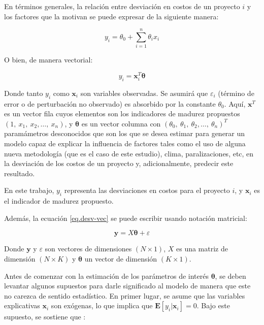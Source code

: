 En términos generales, la relación entre desviación en costos de un proyecto $i$ y los factores que la motivan se puede expresar de la siguiente manera:

\begin{equation}
    \label{eq.desv-gen}
    y_i = \theta_0 +\sum\limits_{i=1}^n \theta_i x_i
\end{equation}

O bien, de manera vectorial:

\begin{equation}
    \label{eq.desv-vec}
    y_i = \bm{x}^T_i\bm{\theta}
\end{equation}

Donde tanto $y_i$ como $\bm{x}_i$ son variables observadas. Se asumirá que $\varepsilon_i$ (término de error o de perturbación no observado) es absorbido por la constante $\theta_0$. Aquí, $\bm{x}^T$ es un vector fila cuyos elementos son los indicadores de madurez propuestos $(1,~x_1,~x_2,\ldots,~x_n)$, y $\bm{\theta}$ es un vector columna con $(\theta_0,~\theta_1,~\theta_2,\ldots,~\theta_n)^T$  paramámetros desconocidos que son los que se desea estimar para generar un modelo capaz de explicar la influencia de factores tales como el uso de alguna nueva metodología (que es el caso de este estudio), clima, paralizaciones, etc, en la desviación de los costos de un proyecto y, adicionalmente, predecir este resultado.

En este trabajo, $y_i$ representa las desviaciones en costos para el proyecto $i$, y $\bm{x}_i$ es el indicador de madurez propuesto.


Además, la ecuación \eqref{eq.desv-vec} se puede escribir usando notación matricial:

\begin{equation}
    \label{eq.matrix}
    \bm{y} = X\bm{\theta} + \varepsilon
\end{equation}

Donde $\bm{y}$ y $\varepsilon$ son vectores de dimensiones $(N\times1)$, $X$ es una matriz de dimensión $(N\times K)$ y $\bm{\theta}$ un vector de dimensión $(K\times1)$.

Antes de comenzar con la estimación de los parámetros de interés $\bm{\theta}$, se deben levantar algunos supuestos para darle significado al modelo de manera que este no carezca de sentido estadístico. En primer lugar, se asume que las variables explicativas $\bm{x}_i$ son exógenas, lo que implica que $\bm{E}[y_i|\bm{x}_i]=0$. Bajo este supuesto, se sostiene que :

